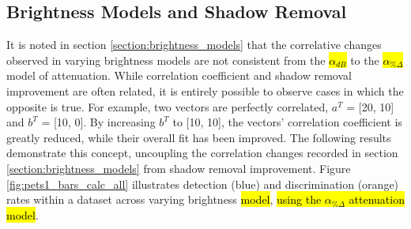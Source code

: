 \documentclass[12pt]{report}
\begin{document}
\subsection{Brightness Models and Shadow Removal}

It is noted in section \ref{section:brightness_models} that the correlative changes observed in varying brightness models are not consistent from the \hl{$\alpha_{dB}$} to the \hl{$\alpha_{\%\Delta}$} model of attenuation. While correlation coefficient and shadow removal improvement are often related, it is entirely possible to observe cases in which the opposite is true. For example, two vectors are perfectly correlated, $a^T$ = [20, 10] and $b^T$ = [10, 0]. By increasing $b^T$ to [10, 10], the vectors' correlation coefficient is greatly reduced, while their overall fit has been improved. The following results demonstrate this concept, uncoupling the correlation changes recorded in section \ref{section:brightness_models} from shadow removal improvement. Figure \ref{fig:pets1_bars_calc_all} illustrates detection (blue) and discrimination (orange) rates within a dataset across varying brightness \hl{model}, \hl{using the $\alpha_{\%\Delta}$ attenuation model}.
\end{document}
